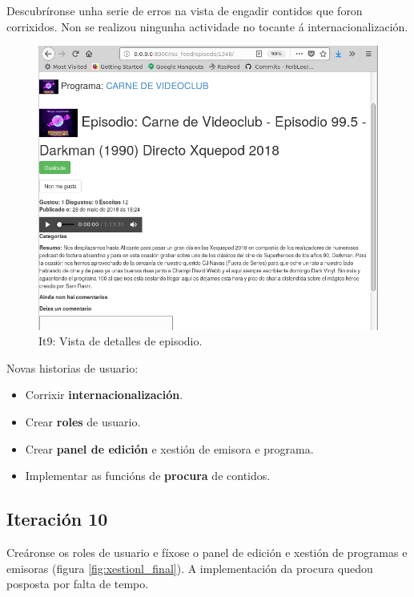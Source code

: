 Descubríronse unha serie de erros na vista de engadir contidos que foron corrixidos. Non se realizou ningunha actividade no tocante á internacionalización.

\begin{figure}[H]
	\centering
	\includegraphics[scale=0.5,keepaspectratio=true]{./images/episode_detail_final.png}
	\caption{It9: Vista de detalles de episodio.}
	\label{fig:episode_detail_final}
\end{figure}

Novas historias de usuario:
\begin{itemize}
	\item Corrixir \textbf{internacionalización}.
	\item Crear \textbf{roles} de usuario.
	\item Crear \textbf{panel de edición} e xestión de emisora e programa.
	\item Implementar as funcións de \textbf{procura} de contidos.
\end{itemize}




\subsection{Iteración 10}

Creáronse os roles de usuario e fíxose o panel de edición e xestión de programas e emisoras (figura \ref{fig:xestionl_final}). A implementación da procura quedou posposta por falta de tempo.

